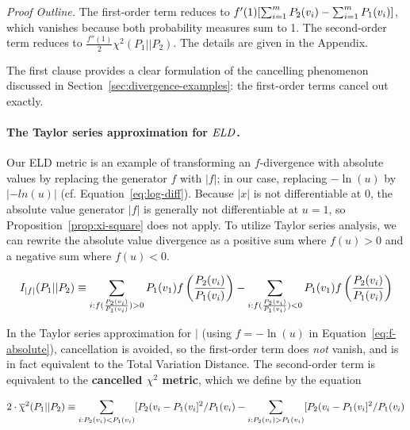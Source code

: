 {{\em Proof Outline.} 
The first-order term reduces to $f'(1) [\sum_{i=1}^{m} P_{2}(v_{i}) - \sum_{i=1}^{m} P_{1}(v_{i})]$, which vanishes because both probability measures sum to 1. The second-order term reduces to $ \frac{f''(1)}{2} \chi^{2}(P_{1}||P_{2})$. The details are given in the Appendix. 

The first clause provides a clear formulation of the cancelling phenomenon discussed in Section~\ref{sec:divergence-examples}: the first-order terms cancel out exactly.


\paragraph{The Taylor series approximation for $\it{ELD}$.}

Our ELD metric is an example of transforming an $f$-divergence with absolute values by replacing the generator $f$ with $|f|$; in our case, replacing $-\ln(u)$ by $|-ln(u)|$ (cf. Equation~\eqref{eq:log-diff}). Because $|x|$ is not differentiable at 0,  the absolute value generator $|f|$ is generally not differentiable at $u=1$, so Proposition~\ref{prop:xi-square} does not apply. To utilize Taylor series analysis, we can rewrite the absolute value divergence as a positive sum where $f(u)>0$ and a negative sum where $f(u) < 0$. 

\begin{equation*} \label{eq:f-absolute}
I_{|f|}(P_{1}||P_{2}) \equiv \sum_{i:f(\frac{P_{2}(v_{i})}{P_{1}(v_{i})})>0} P_{1}(v_{1}) f\left(\frac{P_{2}(v_{i})}{P_{1}(v_{i})}\right) - \sum_{i:f(\frac{P_{2}(v_{i})}{P_{1}(v_{i})})<0} P_{1}(v_{1}) f\left(\frac{P_{2}(v_{i})}{P_{1}(v_{i})}\right)
\end{equation*}

In the Taylor series approximation for $\mid$ (using $f=-\ln(u)$ in Equation~\eqref{eq:f-absolute}), cancellation is avoided, so the first-order term does {\em not} vanish, and is in fact equivalent to the Total Variation Distance. The second-order term is equivalent to the \textbf{cancelled $\chi^2$ metric}, which we define by the equation

\begin{equation*}
2 \cdot \overline{\chi}^2(P_{1}||P_{2}) \equiv  
\sum_{i:P_{2}(v_{i}) < P_{1}(v_{i})} [P_{2}(v_{i}-P_{1}(v_{i}]^2/P_{1}(v_{i}) - 
\sum_{i:P_{2}(v_{i}) > P_{1}(v_{i})} [P_{2}(v_{i}-P_{1}(v_{i}]^2/P_{1}(v_{i})
\end{equation*}


}
